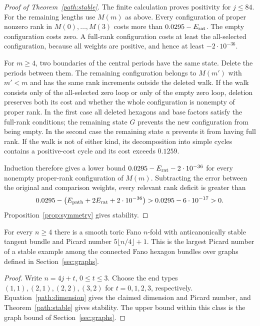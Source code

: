 \begin{proof}[Proof of Theorem~\ref{path:stable}]
The finite calculation proves positivity for $j\le84$. For the remaining
lengths use $M(m)$ as above. Every configuration of proper nonzero rank in
$M(0),\ldots,M(3)$ costs more than $0.0295-E_{\rm rat}$. The empty
configuration costs zero. A full-rank configuration costs at least the
all-selected configuration, because all weights are positive, and hence
at least $-2\cdot10^{-36}$.

For $m\ge4$, two boundaries of the central periods have the same state.
Delete the periods between them. The remaining configuration belongs to
$M(m')$ with $m'<m$ and has the same rank increments outside the deleted
walk. If the walk consists only of the all-selected zero loop or only of
the empty zero loop, deletion preserves both its cost and whether the
whole configuration is nonempty of proper rank. In the first case all
deleted hexagons and base factors satisfy the full-rank conditions; the
remaining state $G$ prevents the new configuration from being empty. In
the second case the remaining state $u$ prevents it from having full rank.
If the walk is not of either kind, its decomposition into simple cycles
contains a positive-cost cycle and its cost exceeds $0.1259$.

Induction therefore gives a lower bound $0.0295-E_{\rm rat}-2\cdot10^{-36}$
for every nonempty proper-rank configuration of $M(m)$. Subtracting the
error between the original and comparison weights, every relevant rank
deficit is greater than
\[
 0.0295-\bigl(E_{\rm path}+2E_{\rm rat}+2\cdot10^{-36}\bigr)
 >0.0295-6\cdot10^{-17}>0.
\]
Proposition~\ref{prop:symmetry} gives stability.
\end{proof}

\begin{corollary}\label{path:everydimension}
For every $n\ge4$ there is a smooth toric Fano $n$-fold with anticanonically
stable tangent bundle and Picard number $5\lfloor n/4\rfloor+1$.
This is the largest Picard number of a stable example among the connected
Fano hexagon bundles over graphs defined in Section~\ref{sec:graphs}.
\end{corollary}

\begin{proof}
Write $n=4j+t$, $0\le t\le3$. Choose the end types
$(1,1),(2,1),(2,2),(3,2)$ for $t=0,1,2,3$, respectively.
Equation~\eqref{path:dimension} gives the claimed dimension and Picard
number, and Theorem~\ref{path:stable} gives stability. The upper bound
within this class is the graph bound of Section~\ref{sec:graphs}.
\end{proof}

